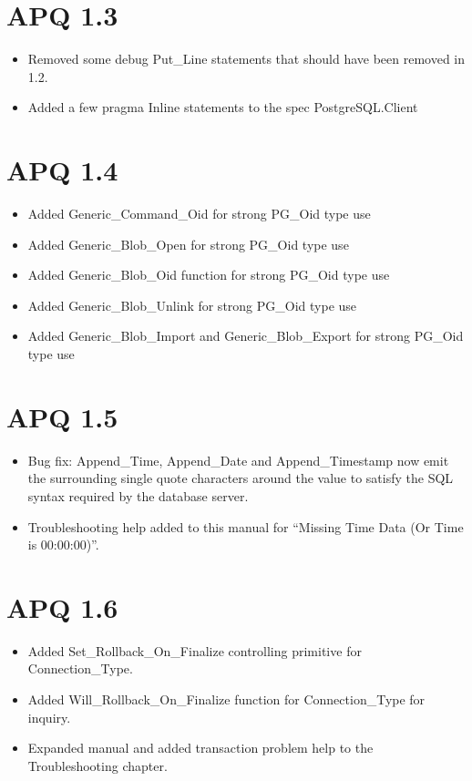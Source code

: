 \documentclass[english,letterpaper]{book}
\begin{document}
\section*{APQ 1.3}

\begin{itemize}
   \item Removed some debug Put\_Line statements that should have been removed
         in 1.2.
   \item Added a few pragma Inline statements to the spec PostgreSQL.Client
\end{itemize}

\section*{APQ 1.4}

\begin{itemize}
   \item Added Generic\_Command\_Oid for strong PG\_Oid type use
   \item Added Generic\_Blob\_Open for strong PG\_Oid type use
   \item Added Generic\_Blob\_Oid function for strong PG\_Oid type use
   \item Added Generic\_Blob\_Unlink for strong PG\_Oid type use
   \item Added Generic\_Blob\_Import and Generic\_Blob\_Export for strong PG\_Oid
         type use
\end{itemize}

\section*{APQ 1.5}

\begin{itemize}
   \item Bug fix: Append\_Time, Append\_Date and Append\_Timestamp now emit
         the surrounding single quote characters around the value to satisfy
         the SQL syntax required by the database server.
   \item Troubleshooting help added to this manual for {}``Missing Time Data
         (Or Time is 00:00:00)''.
\end{itemize}

\section*{APQ 1.6}

\begin{itemize}
   \item Added Set\_Rollback\_On\_Finalize controlling primitive for Connection\_Type.
   \item Added Will\_Rollback\_On\_Finalize function for Connection\_Type for
         inquiry.
   \item Expanded manual and added transaction problem help to the Troubleshooting
         chapter.
\end{itemize}
\end{document}
